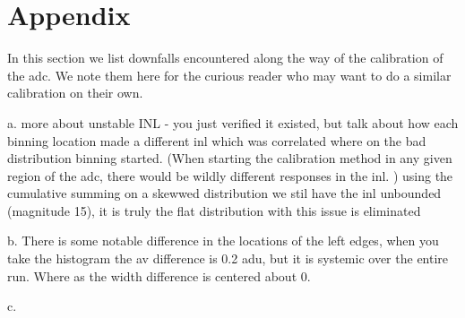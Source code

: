 \documentclass[11pt, letterpaper]{article}
\begin{document}
\section{Appendix}
In this section we list downfalls encountered along the way of the calibration of the adc. We note them here for the curious reader who may want to do a similar calibration on their own. 

a. more about unstable INL - you just verified it existed, but talk about how each binning location made a different inl which was correlated where on the bad distribution binning started. (When starting the calibration method in any given region of the adc, there would be wildly different responses in the inl. ) using the cumulative summing on a skewwed distribution we stil have the inl unbounded (magnitude 15), it is truly the flat distribution with this issue is eliminated 

b. There is some notable difference in the locations of the left edges, when you take the histogram the av difference is 0.2 adu, but it is systemic over the entire run. Where as the width difference is centered about 0. 

c. 
\end{document}

